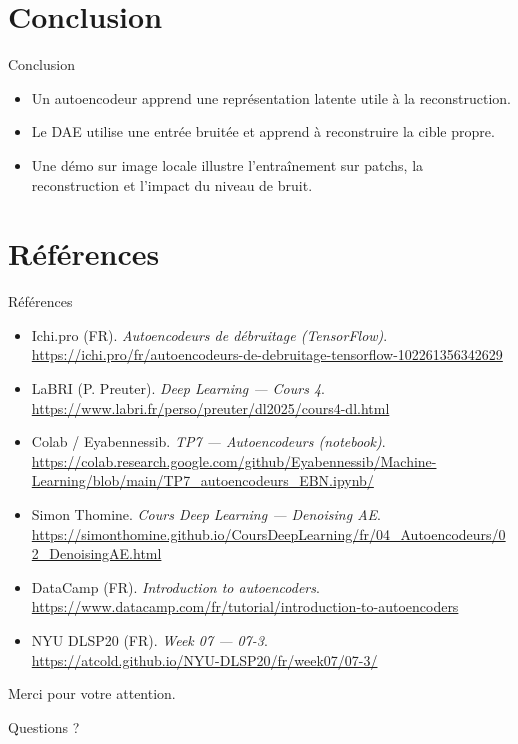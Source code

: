 \documentclass[11pt,aspectratio=169]{beamer}
\newcommand{\accentbox}[1]{%
  \begin{center}
  \begin{tcolorbox}[
    enhanced,
    width=0.94\linewidth,
    colback=accent!6,
    colframe=accent,
    arc=2.2mm,
    boxrule=0.6pt,
    left=6pt,right=6pt,top=6pt,bottom=6pt,
    drop shadow={black!35!white}
  ]
  #1
  \end{tcolorbox}
  \end{center}
}
\begin{document}
\section{Conclusion}

\begin{frame}{Conclusion}
\accentbox{%
  \begin{itemize}
    \item Un autoencodeur apprend une représentation latente utile à la reconstruction.
    \item Le DAE utilise une entrée bruitée et apprend à reconstruire la cible propre.
    \item Une démo sur image locale illustre l'entraînement sur patchs, la reconstruction et l'impact du niveau de bruit.
  \end{itemize}
}
\end{frame}

\section{Références}

\begin{frame}{Références}
\scriptsize
\begin{itemize}
  \item Ichi.pro (FR). \emph{Autoencodeurs de débruitage (TensorFlow)}.\\
  \url{https://ichi.pro/fr/autoencodeurs-de-debruitage-tensorflow-102261356342629}

  \item LaBRI (P. Preuter). \emph{Deep Learning — Cours 4}.\\
  \url{https://www.labri.fr/perso/preuter/dl2025/cours4-dl.html}

  \item Colab / Eyabennessib. \emph{TP7 — Autoencodeurs (notebook)}.\\
  \url{https://colab.research.google.com/github/Eyabennessib/Machine-Learning/blob/main/TP7_autoencodeurs_EBN.ipynb/}

  \item Simon Thomine. \emph{Cours Deep Learning — Denoising AE}.\\
  \url{https://simonthomine.github.io/CoursDeepLearning/fr/04_Autoencodeurs/02_DenoisingAE.html}

  \item DataCamp (FR). \emph{Introduction to autoencoders}.\\
  \url{https://www.datacamp.com/fr/tutorial/introduction-to-autoencoders}

  \item NYU DLSP20 (FR). \emph{Week 07 — 07-3}.\\
  \url{https://atcold.github.io/NYU-DLSP20/fr/week07/07-3/}
\end{itemize}
\end{frame}

\begin{frame}
  \vfill
  \accentbox{\centering\Large Merci pour votre attention.}
  \vfill
\end{frame}

\begin{frame}
  \vfill
  \accentbox{\centering\Huge Questions ?}
  \vfill
\end{frame}
\end{document}
